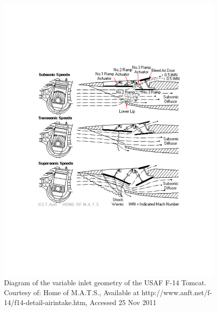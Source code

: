 \documentclass[12pt,letterpaper]{article}
\begin{document}
\begin{figure}[htbp]
   \centering
   \includegraphics[width=\textwidth]{F_14_inlet_diagram.pdf}
   \vspace{-1.5in}
   \caption[Diagram of USAF F-14 Tomcat]{Diagram of the variable inlet
     geometry of the USAF F-14 Tomcat. Courtesy of: Home of M.A.T.S.,
     Available at http://www.anft.net/f-14/f14-detail-airintake.htm,
     Accessed 25 Nov 2011}
   \label{fig:f-14_diagram}
\end{figure}

\end{document}
